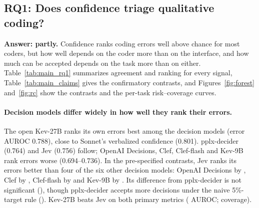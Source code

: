\subsection{RQ1: Does confidence triage qualitative coding?}
\label{sec:rq1}

\textbf{Answer: partly.} Confidence ranks coding errors well above chance for most coders, but how well depends on the coder
more than on the interface, and how much can be accepted depends on the task more than on either.
Table~\ref{tab:main_rq1} summarizes agreement and ranking for every signal, Table~\ref{tab:main_claims} gives the
confirmatory contrasts, and Figures~\ref{fig:forest} and~\ref{fig:rc} show the contrasts and the per-task risk--coverage
curves.

\paragraph{Decision models differ widely in how well they rank their errors.} The open Kev-27B ranks its own errors best among
the decision models (error AUROC 0.788), close to Sonnet's verbalized confidence (0.801). pplx-decider (0.764) and Jev (0.756)
follow; OpenAI Decisions, Clef, Clef-flash and Kev-9B rank errors worse (0.694--0.736). In the pre-specified contrasts, Jev
ranks its errors better than four of the six other decision models: OpenAI Decisions by , Clef by
, Clef-flash by  and Kev-9B by . Its
difference from pplx-decider is not significant (), though pplx-decider accepts more decisions
under the naive 5\%-target rule (). Kev-27B beats Jev on both primary metrics
( AUROC;  coverage).

